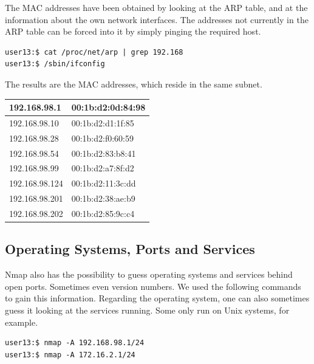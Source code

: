 \documentclass[12pt,a4paper,titlepage,oneside]{scrartcl}
\begin{document}
The MAC addresses have been obtained by looking at the ARP table, and at the information about the own network interfaces. The addresses not currently in the ARP table can be forced into it by simply pinging the required host.

\begin{lstlisting}[style=simple]
user13:$ cat /proc/net/arp | grep 192.168
user13:$ /sbin/ifconfig
\end{lstlisting}

The results are the MAC addresses, which reside in the same subnet.

\begin{tabular}{| l | l |}
\hline
192.168.98.1 & 00:1b:d2:0d:84:98 \\ \hline
192.168.98.10 & 00:1b:d2:d1:1f:85 \\ \hline
192.168.98.28 & 00:1b:d2:f0:60:59 \\ \hline
192.168.98.54 & 00:1b:d2:83:b8:41 \\ \hline
192.168.98.99 & 00:1b:d2:a7:8f:d2 \\ \hline
192.168.98.124 & 00:1b:d2:11:3c:dd \\ \hline
192.168.98.201 & 00:1b:d2:38:ae:b9 \\ \hline
192.168.98.202 & 00:1b:d2:85:9c:c4 \\ \hline
\end{tabular}

\subsection{Operating Systems, Ports and Services}

Nmap also has the possibility to guess operating systems and services behind open ports. Sometimes even version numbers. We used the following commands to gain this information. Regarding the operating system, one can also sometimes guess it looking at the services running. Some only run on Unix systems, for example.

\begin{lstlisting}[style=simple]
user13:$ nmap -A 192.168.98.1/24
user13:$ nmap -A 172.16.2.1/24
\end{lstlisting}
\end{document}
